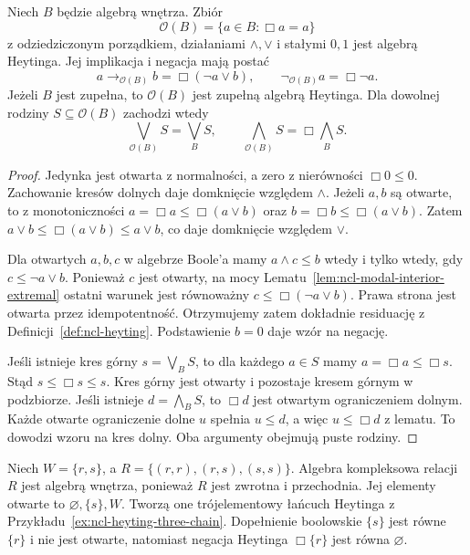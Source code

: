 \begin{twierdzenie}
\label{thm:ncl-modal-open-heyting}
Niech $B$ będzie algebrą wnętrza. Zbiór
\[
 \mathcal O(B)=\{a\in B:\Box a=a\}
\]
z odziedziczonym porządkiem, działaniami
$\wedge,\vee$ i stałymi $0,1$ jest algebrą
Heytinga. Jej implikacja i negacja mają postać
\[
 a\to_{\mathcal O(B)}b=\Box(\neg a\vee b),
 \qquad
 \neg_{\mathcal O(B)}a=\Box\neg a.
\]
Jeżeli $B$ jest zupełna, to $\mathcal O(B)$
jest zupełną algebrą Heytinga. Dla dowolnej
rodziny $S\subseteq\mathcal O(B)$ zachodzi wtedy
\[
 \bigvee_{\mathcal O(B)}S=\bigvee_B S,
 \qquad
 \bigwedge_{\mathcal O(B)}S=\Box\bigwedge_B S.
\]
\end{twierdzenie}
\begin{proof}
Jedynka jest otwarta z normalności,
a zero z nierówności $\Box0\leq0$.
Zachowanie kresów dolnych daje domknięcie
względem $\wedge$.
Jeżeli $a,b$ są otwarte, to z monotoniczności
$a=\Box a\leq\Box(a\vee b)$ oraz
$b=\Box b\leq\Box(a\vee b)$.
Zatem $a\vee b\leq\Box(a\vee b)\leq a\vee b$,
co daje domknięcie względem $\vee$.

Dla otwartych $a,b,c$ w algebrze Boole'a
mamy $a\wedge c\leq b$ wtedy i tylko wtedy,
gdy $c\leq\neg a\vee b$.
Ponieważ $c$ jest otwarty, na mocy
Lematu~\ref{lem:ncl-modal-interior-extremal}
ostatni warunek jest równoważny
$c\leq\Box(\neg a\vee b)$.
Prawa strona jest otwarta przez idempotentność.
Otrzymujemy zatem dokładnie residuację
z Definicji~\ref{def:ncl-heyting}.
Podstawienie $b=0$ daje wzór na negację.

Jeśli istnieje kres górny $s=\bigvee_B S$,
to dla każdego $a\in S$ mamy
$a=\Box a\leq\Box s$. Stąd
$s\leq\Box s\leq s$. Kres górny jest otwarty
i pozostaje kresem górnym w podzbiorze.
Jeśli istnieje $d=\bigwedge_B S$,
to $\Box d$ jest otwartym ograniczeniem dolnym.
Każde otwarte ograniczenie dolne $u$ spełnia
$u\leq d$, a więc $u\leq\Box d$ z lematu.
To dowodzi wzoru na kres dolny.
Oba argumenty obejmują puste rodziny.
\end{proof}

\begin{przyklad}
\label{ex:ncl-modal-open-not-boolean}
Niech $W=\{r,s\}$, a $R=\{(r,r),(r,s),(s,s)\}$.
Algebra kompleksowa relacji $R$ jest algebrą
wnętrza, ponieważ $R$ jest zwrotna i przechodnia.
Jej elementy otwarte to
$\varnothing,\{s\},W$.
Tworzą one trójelementowy łańcuch Heytinga
z Przykładu~\ref{ex:ncl-heyting-three-chain}.
Dopełnienie boolowskie $\{s\}$ jest równe
$\{r\}$ i nie jest otwarte, natomiast
negacja Heytinga $\Box\{r\}$ jest równa
$\varnothing$.
\end{przyklad}

